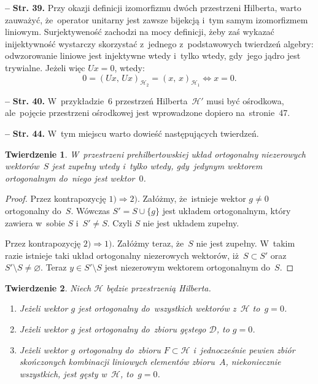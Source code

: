 \documentclass[a4paper,11pt]{article}
\newtheorem{twr}{Twierdzenie} %
\newcommand{\spaceFour}{0.5em}
\newcommand{\tb}{\textbf}
\newcommand{\noi}{\noindent}
\newcommand{\tb}{\textbf}
\newcommand{\noi}{\noindent}
\newcommand{\start}{\noi \tb{--} {}}
\newcommand{\Str}[1]{\tb{Str. #1.}}
\let\emptyset\varnothing
\newcommand{\mc}{\mathcal}
\newcommand{\Ra}{\Rightarrow}
\newcommand{\wtw}{wtedy i~tylko wtedy}
\newcommand{\Dc}{\mc{D}}
\newcommand{\Hc}{\mc{H}}
\newcommand{\set}[1]{\{ #1 \}}
\newcommand{\es}{\emptyset}
\newcommand{\subs}{\subset}
\newcommand{\setm}{\setminus}
\newcommand{\SP}[2]{( #1, \, #2 )}  %
\begin{document}
\vspace{\spaceFour}


\start \Str{39} Przy okazji definicji izomorfizmu dwóch przestrzeni
Hilberta, warto zauważyć, że~operator unitarny jest zawsze bijekcją
i~tym samym izomorfizmem liniowym. Surjektyweność zachodzi na mocy
definicji, żeby zaś wykazać inijektywność wystarczy skorzystać
z~jednego z~podstawowych twierdzeń algebry: odwzorowanie liniowe jest
injektywne \wtw, gdy~jego jądro jest trywialne. Jeżeli więc $Ux = 0$,
wtedy:
\begin{equation*}
  0 = \SP{ Ux }{ Ux }_{ \Hc_{ 2 } } = \SP{ x }{ x }_{ \Hc_{ 1 } } \iff x = 0.
\end{equation*}

\vspace{\spaceFour}


\start \Str{40} W~przykładzie~6 przestrzeń Hilberta~$\Hc'$ musi być
ośrodkowa, ale~pojęcie przestrzeni ośrodkowej jest wprowadzone dopiero
na~stronie~47. %

\vspace{\spaceFour}


\start \Str{44} W~tym miejscu warto dowieść następujących twierdzeń.
\begin{twr}
  \label{twr:UkladZupelny}
  W~przestrzeni prehilbertowskiej układ ortogonalny niezerowych
  wektorów~$S$ jest zupełny \wtw, gdy~jedynym wektorem ortogonalnym
  do~niego jest wektor~$0$.
\end{twr}

\begin{proof}
  Przez kontrapozycję $1) \Ra 2)$. Załóżmy, że~istnieje wektor
  $g \neq 0$ ortogonalny do~$S$. Wówczas $S' = S \cup \set{ g }$ jest
  układem ortogonalnym, który zawiera w~sobie $S$ i~$S' \neq S$. Czyli
  $S$ nie jest układem zupełny.

  Przez kontrapozycję $2) \Ra 1)$. Załóżmy teraz, że~$S$ nie jest
  zupełny. W~takim razie istnieje taki układ ortogonalny niezerowych
  wektorów, iż~$S \subs S'$ oraz $S' \setm S \neq \es$. Teraz
  $y \in S' \setm S$ jest niezerowym wektorem ortogonalnym do~$S$.
\end{proof}

\begin{twr}
  \label{twr:OrotgonalnoscDoZbioruGestegoIBazy}
  Niech $\Hc$ będzie przestrzenią Hilberta.
  \begin{enumerate}
  \item Jeżeli wektor $g$ jest ortogonalny do~wszystkich wektorów
    z~$\Hc$ to~$g = 0$.
  \item Jeżeli wektor $g$ jest ortogonalny do~zbioru gęstego $\Dc$, to
    $g = 0$.
  \item Jeżeli wektor $g$ ortogonalny do~zbioru $F \subs \Hc$
    i~jednocześnie pewien zbiór skończonych kombinacji liniowych
    elementów zbioru~$A$, niekoniecznie wszystkich, jest gęsty
    w~$\Hc$, to~$g = 0$.
  \end{enumerate}
\end{twr}
\end{document}
